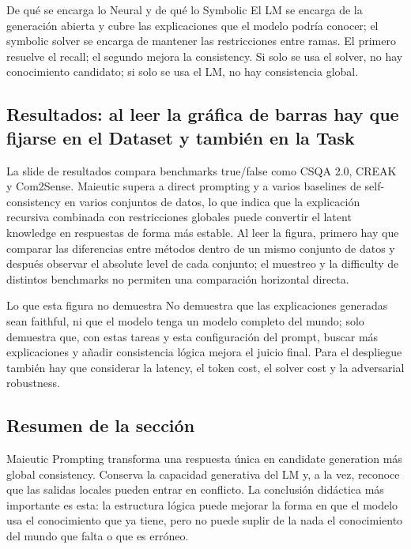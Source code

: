 \begin{knowledgebox}{De qué se encarga lo Neural y de qué lo Symbolic}
El LM se encarga de la generación abierta y cubre las explicaciones que el modelo podría conocer; el symbolic solver se encarga de mantener las restricciones entre ramas. El primero resuelve el recall; el segundo mejora la consistency. Si solo se usa el solver, no hay conocimiento candidato; si solo se usa el LM, no hay consistencia global.
\end{knowledgebox}

\subsection{Resultados: al leer la gráfica de barras hay que fijarse en el Dataset y también en la Task}

La slide de resultados compara benchmarks true/false como CSQA 2.0, CREAK y Com2Sense. Maieutic supera a direct prompting y a varios baselines de self-consistency en varios conjuntos de datos, lo que indica que la explicación recursiva combinada con restricciones globales puede convertir el latent knowledge en respuestas de forma más estable. Al leer la figura, primero hay que comparar las diferencias entre métodos dentro de un mismo conjunto de datos y después observar el absolute level de cada conjunto; el muestreo y la difficulty de distintos benchmarks no permiten una comparación horizontal directa.


\begin{warningbox}{Lo que esta figura no demuestra}
No demuestra que las explicaciones generadas sean faithful, ni que el modelo tenga un modelo completo del mundo; solo demuestra que, con estas tareas y esta configuración del prompt, buscar más explicaciones y añadir consistencia lógica mejora el juicio final. Para el despliegue también hay que considerar la latency, el token cost, el solver cost y la adversarial robustness.
\end{warningbox}

\subsection{Resumen de la sección}

Maieutic Prompting transforma una respuesta única en candidate generation más global consistency. Conserva la capacidad generativa del LM y, a la vez, reconoce que las salidas locales pueden entrar en conflicto. La conclusión didáctica más importante es esta: la estructura lógica puede mejorar la forma en que el modelo usa el conocimiento que ya tiene, pero no puede suplir de la nada el conocimiento del mundo que falta o que es erróneo.

